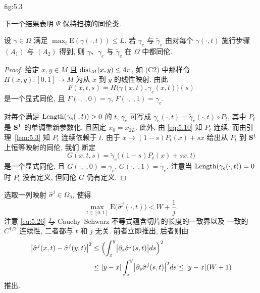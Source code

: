 
%
{fig:5.3}

下一个结果表明 $\Psi$ 保持扫掠的同伦类.

\begin{lemma}
\label{lem:5.5}
设 $\gamma\in\Omega$ 满足 $\max_t\mathrm{E}(\gamma(\cdot,t))\leq L$. 若
$\gamma_e$ 与 $\tilde{\gamma}_e$ 由对每个 $\gamma(\cdot,t)$ 施行步骤
$(A_1)$ 与 $(A_2)$ 得到, 则 $\gamma$、$\gamma_e$ 与 $\tilde{\gamma}_e$
在 $\Omega$ 中都同伦.
\end{lemma}

\begin{proof}
给定 $x,y\in M$ 且 $\operatorname{dist}_M(x,y)\leq 4\pi$, 如 (C2) 中那样令
$H(x,y):[0,1]\to M$ 为从 $x$ 到 $y$ 的线性映射. 由此
\begin{equation}
F(x,t,s)=H\bigl(\gamma(x,t),\gamma_e(x,t)\bigr)(s)
\label{eq:5.24}
\end{equation}
是一个显式同伦, 且 $F(\cdot,\cdot,0)=\gamma$, $F(\cdot,\cdot,1)=\gamma_e$.

对每个满足 $\operatorname{Length}(\gamma_e(\cdot,t))>0$ 的 $t$, $\gamma_e$ 可写成
$\gamma_e(\cdot,t)=\tilde{\gamma}_e(\cdot,t)\circ P_t$, 其中 $P_t$ 是
$\mathbf{S}^1$ 的单调重新参数化, 且固定 $x_0=x_{2L}$. 此外, 由 \eqref{eq:5.10}
知 $P_t$ 连续, 而由引理~\ref{lem:5.3} 知 $P_t$ 连续依赖于 $t$. 由于
$x\mapsto(1-s)P_t(x)+sx$ 给出从 $P_t$ 到 $\mathbf{S}^1$ 上恒等映射的同伦, 我们
断定
\begin{equation}
G(x,t,s)=\tilde{\gamma}_e\bigl((1-s)P_t(x)+sx,t\bigr)
\label{eq:5.25}
\end{equation}
是一个显式同伦, 且 $G(\cdot,\cdot,0)=\gamma_e$,
$G(\cdot,\cdot,1)=\tilde{\gamma}_e$. 注意当
$\operatorname{Length}(\gamma_e(\cdot,t))=0$ 时 $P_t$ 没有定义, 但同伦 $G$ 仍有定义.
\end{proof}

选取一列映射 $\hat{\sigma}^j\in\Omega_{\hat{\sigma}}$, 使得
\begin{equation}
\max_{t\in[0,1]}\mathrm{E}\bigl(\hat{\sigma}^j(\cdot,t)\bigr)
<W+\frac1j.
\label{eq:5.26}
\end{equation}
注意 \eqref{eq:5.26} 与 Cauchy--Schwarz 不等式蕴含切片的长度的一致界以及
一致的 $C^{1/2}$ 连续性, 二者都与 $t$ 和 $j$ 无关. 前者立即推出, 后者则由
\begin{equation}
\begin{aligned}
\bigl|\hat{\sigma}^j(x,t)-\hat{\sigma}^j(y,t)\bigr|^2
&\leq\Bigl(\int_x^y\bigl|\partial_s\hat{\sigma}^j(s,t)\bigr|ds\Bigr)^2\\
&\leq|y-x|\int_x^y\bigl|\partial_s\hat{\sigma}^j(s,t)\bigr|^2ds
 \leq|y-x|(W+1)
\end{aligned}
\label{eq:5.27}
\end{equation}
推出.

